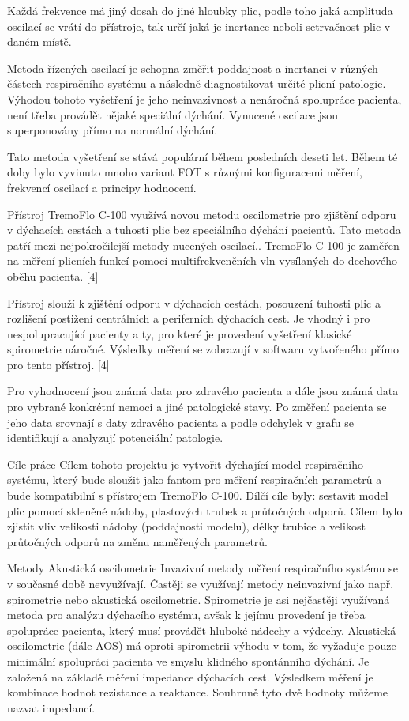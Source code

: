 Každá frekvence má jiný dosah do jiné hloubky plic, podle toho jaká amplituda oscilací se vrátí do přístroje, tak určí jaká je inertance neboli setrvačnost plic v daném místě. 

Metoda řízených oscilací je schopna změřit poddajnost a inertanci v různých částech respiračního systému a následně diagnostikovat určité plicní patologie. 
Výhodou tohoto vyšetření je jeho neinvazivnost a nenáročná spolupráce pacienta, není třeba provádět nějaké speciální dýchání. Vynucené oscilace jsou superponovány přímo na normální dýchání. 

Tato metoda vyšetření se stává populární během posledních deseti let. Během té doby bylo vyvinuto mnoho variant FOT s různými konfiguracemi měření, frekvencí oscilací a principy hodnocení. 

Přístroj TremoFlo C-100 využívá novou metodu oscilometrie pro zjištění odporu  v dýchacích cestách a tuhosti plic bez speciálního dýchání pacientů. Tato metoda patří mezi nejpokročilejší metody nucených oscilací.. TremoFlo C-100 je zaměřen na měření plicních funkcí pomocí multifrekvenčních vln vysílaných do dechového oběhu pacienta. [4]

Přístroj slouží k zjištění odporu v dýchacích cestách, posouzení tuhosti plic a rozlišení postižení centrálních a periferních dýchacích cest. Je vhodný i pro nespolupracující pacienty a ty, pro které je provedení vyšetření klasické spirometrie náročné. 
Výsledky měření se zobrazují v softwaru vytvořeného přímo pro tento přístroj. [4]

Pro vyhodnocení jsou známá data pro zdravého pacienta a dále jsou známá data pro vybrané konkrétní nemoci a jiné patologické stavy.  Po změření pacienta se jeho data srovnají s daty zdravého pacienta a podle odchylek v grafu se identifikují a analyzují potenciální patologie. 




\chap Cíle práce
Cílem tohoto projektu je vytvořit dýchající model respiračního systému, který bude sloužit jako fantom pro měření respiračních parametrů a bude kompatibilní s přístrojem TremoFlo C-100. Dílčí cíle byly: sestavit model plic pomocí skleněné nádoby, plastových trubek a průtočných odporů. Cílem bylo zjistit vliv velikosti nádoby (poddajnosti modelu), délky trubice a velikost průtočných odporů na změnu naměřených parametrů. 

\chap Metody
\sec Akustická oscilometrie 
Invazivní metody měření respiračního systému se v současné době nevyužívají. Častěji se využívají metody neinvazivní jako např. spirometrie nebo akustická oscilometrie. Spirometrie je asi nejčastěji využívaná metoda pro analýzu dýchacího systému, avšak k jejímu provedení je třeba spolupráce pacienta, který musí provádět hluboké nádechy a výdechy.
Akustická oscilometrie (dále AOS) má oproti spirometrii výhodu v tom, že vyžaduje pouze minimální spolupráci pacienta ve smyslu klidného spontánního dýchání. 
Je založená na základě měření impedance dýchacích cest. Výsledkem měření je kombinace hodnot rezistance a reaktance. Souhrnně tyto dvě hodnoty můžeme nazvat impedancí. 

